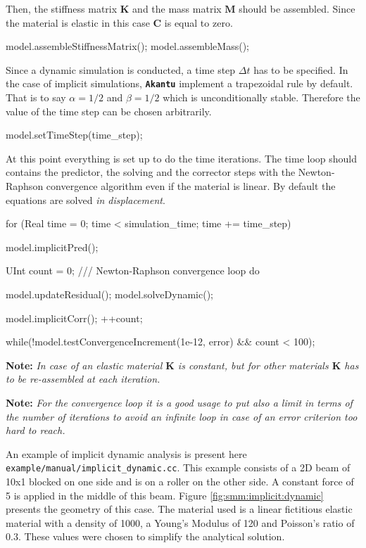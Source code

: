 \documentclass[a4paper,11pt]{book}
\newcommand{\akantu}{{\texttt{\textbf{Akantu}}}\xspace}
\newcommand{\code}[1]{\texttt{#1}}
\newcommand{\note}[1]{\textbf{Note: }\textit{#1}}
\newcommand{\mat}[1]{\ensuremath{\boldsymbol{#1}}}
\begin{document}
Then, the  stiffness matrix  $\mat{K}$ and the  mass matrix $\mat{M}$  should be
assembled.  Since  the material is  elastic in this  case $\mat{C}$ is  equal to
zero.
\begin{cpp}
  model.assembleStiffnessMatrix();
  model.assembleMass();
\end{cpp}

Since  a dynamic  simulation is  conducted, a  time step  $\Delta t$  has  to be
specified. In the case of  implicit simulations, \akantu implement a trapezoidal
rule by  default.  That  is to say  $\alpha =  1/2$ and $\beta  = 1/2$  which is
unconditionally  stable. Therefore  the value  of the  time step  can  be chosen
arbitrarily.  
\begin{cpp}
  model.setTimeStep(time_step);
\end{cpp}

At this  point everything is  set up  to do the  time iterations. The  time loop
should  contains the predictor,  the solving  and the  corrector steps  with the
Newton-Raphson convergence algorithm even if the material is linear.  By default
the        equations       are       solved        \emph{in       displacement}.
\begin{cpp}
  for (Real time = 0; time < simulation_time; time += time_step) {
    model.implicitPred();

    UInt count = 0;
    /// Newton-Raphson convergence loop
    do {
      model.updateResidual();
      model.solveDynamic();

      model.implicitCorr();
      ++count;
    } while(!model.testConvergenceIncrement(1e-12, error) && count < 100);
  }
\end{cpp}

\note{In  case of  an  elastic material  $\mat{K}$  is constant,  but for  other
  materials $\mat{K}$ has to be re-assembled at each iteration.}

\note{For the convergence loop  it is a good usage to put  also a limit in terms
  of the  number of iterations  to avoid  an infinite loop  in case of  an error
  criterion too hard to reach.}

An    example    of    implicit     dynamic    analysis    is    present    here
\code{example/manual/implicit\_dynamic.cc}.  This example  consists of a 2D beam
of \unit{10}{\meter}x\unit{1}{\meter} blocked on one  side and is on a roller on
the other  side.  A constant force  of \unit{5}{\kilo\newton} is  applied in the
middle  of  this   beam.   Figure  \ref{fig:smm:implicit:dynamic}  presents  the
geometry of this case. The material used is a linear fictitious elastic material
with  a density  of  \unit{1000}{\kilogrampercubicmetre}, a  Young's Modulus  of
\unit{120}{\mega\pascal} and Poisson's ratio  of $0.3$. These values were chosen
to simplify the analytical solution.
\end{document}
